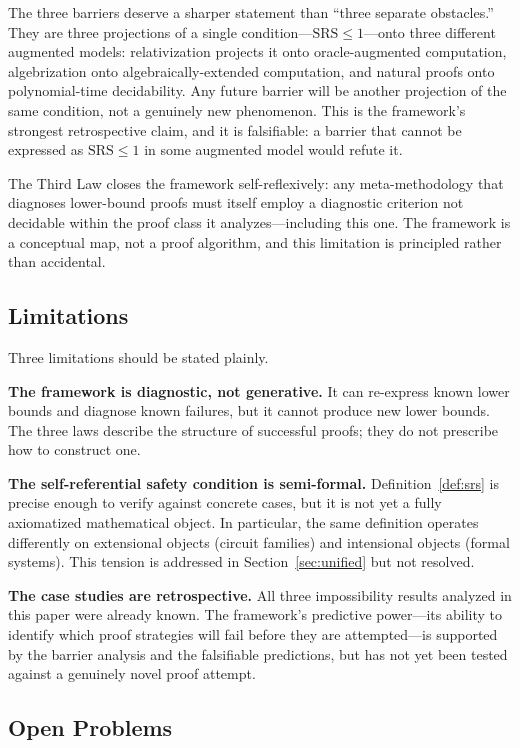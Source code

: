 \documentclass[11pt,a4paper]{article}
\theoremstyle{plain}
\theoremstyle{definition}
\theoremstyle{remark}
\newcommand{\SRS}{\mathrm{SRS}}
\begin{document}
The three barriers deserve a sharper statement than ``three separate obstacles.'' They are three projections of a single condition---$\SRS \leq 1$---onto three different augmented models: relativization projects it onto oracle-augmented computation, algebrization onto algebraically-extended computation, and natural proofs onto polynomial-time decidability. Any future barrier will be another projection of the same condition, not a genuinely new phenomenon. This is the framework's strongest retrospective claim, and it is falsifiable: a barrier that cannot be expressed as $\SRS \leq 1$ in some augmented model would refute it.

The Third Law closes the framework self-reflexively: any meta-methodology that diagnoses lower-bound proofs must itself employ a diagnostic criterion not decidable within the proof class it analyzes---including this one. The framework is a conceptual map, not a proof algorithm, and this limitation is principled rather than accidental.

\subsection{Limitations}

Three limitations should be stated plainly.

\textbf{The framework is diagnostic, not generative.} It can re-express known lower bounds and diagnose known failures, but it cannot produce new lower bounds. The three laws describe the structure of successful proofs; they do not prescribe how to construct one.

\textbf{The self-referential safety condition is semi-formal.} Definition~\ref{def:srs} is precise enough to verify against concrete cases, but it is not yet a fully axiomatized mathematical object. In particular, the same definition operates differently on extensional objects (circuit families) and intensional objects (formal systems). This tension is addressed in Section~\ref{sec:unified} but not resolved.

\textbf{The case studies are retrospective.} All three impossibility results analyzed in this paper were already known. The framework's predictive power---its ability to identify which proof strategies will fail before they are attempted---is supported by the barrier analysis and the falsifiable predictions, but has not yet been tested against a genuinely novel proof attempt.

\subsection{Open Problems}
\end{document}
